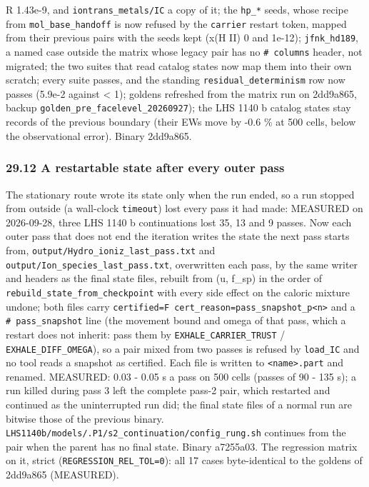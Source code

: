 \documentclass[english,a4paper]{my_memo}
\begin{document}
\textbar\textbar R\textbar\textbar{} 1.43e-9, and \texttt{iontrans\_metals/IC} a copy of it; the \texttt{hp\_*} seeds,
whose recipe from \texttt{mol\_base\_handoff} is now refused by the \texttt{carrier} restart
token, mapped from their previous pairs with the seeds kept (x(H II) 0 and
1e-12); \texttt{jfnk\_hd189}, a named case outside the matrix whose legacy pair has
no \texttt{\#\ columns} header, not migrated; the two suites that read catalog states
now map them into their own scratch; every suite passes, and the standing
\texttt{residual\_determinism} row now passes (5.9e-2 against \textless{} 1); goldens
refreshed from the matrix run on 2dd9a865, backup
\texttt{golden\_pre\_facelevel\_20260927}); the LHS 1140 b catalog states stay
records of the previous
boundary (their EWs move by -0.6 \% at 500 cells, below the observational
error). Binary 2dd9a865.

\subsubsection{29.12 A restartable state after every outer pass}\label{2912-a-restartable-state-after-every-outer-pass}

The stationary route wrote its state only when the run ended, so a run
stopped from outside (a wall-clock \texttt{timeout}) lost every pass it had made:
MEASURED on 2026-09-28, three LHS 1140 b continuations lost 35, 13 and 9
passes. Now each outer pass that does not end the iteration writes the state
the next pass starts from, \texttt{output/Hydro\_ioniz\_last\_pass.txt} and
\texttt{output/Ion\_species\_last\_pass.txt}, overwritten each pass, by the same writer
and headers as the final state files, rebuilt from (u, f\_sp) in the order of
\texttt{rebuild\_state\_from\_checkpoint} with every side effect on the caloric mixture
undone; both files carry \texttt{certified=F\ cert\_reason=pass\_snapshot\_p\textless{}n\textgreater{}} and a
\texttt{\#\ pass\_snapshot} line (the movement bound and omega of that pass, which a
restart does not inherit: pass them by \texttt{EXHALE\_CARRIER\_TRUST} /
\texttt{EXHALE\_DIFF\_OMEGA}), so a pair mixed from two passes is refused by
\texttt{load\_IC} and no tool reads a snapshot as certified. Each file is written to
\texttt{\textless{}name\textgreater{}.part} and renamed. MEASURED: 0.03 - 0.05 s a pass on 500 cells
(passes of 90 - 135 s); a run killed during pass 3 left the complete pass-2
pair, which restarted and continued as the uninterrupted run did; the final
state files of a normal run are bitwise those of the previous binary.
\texttt{LHS1140b/models/.P1/s2\_continuation/config\_rung.sh} continues from the pair
when the parent has no final state. Binary a7255a03. The regression matrix
on it, strict (\texttt{REGRESSION\_REL\_TOL=0}): all 17 cases byte-identical to the
goldens of 2dd9a865 (MEASURED).
\end{document}
